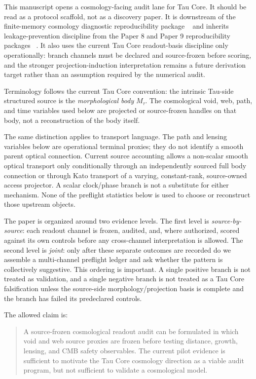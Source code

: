 \documentclass[11pt]{article}
\begin{document}
This manuscript opens a cosmology-facing audit lane for Tau Core. It should be
read as a protocol scaffold, not as a discovery paper. It is downstream of the
finite-memory cosmology diagnostic reproducibility package
~\cite{Paper5FiniteMemory} and inherits leakage-prevention discipline from the
Paper 8 and Paper 9 reproducibility packages
~\cite{Paper8ForwardReadout,Paper9ProjectionReadout}.
It also uses the current Tau Core readout-basis discipline only operationally:
branch channels must be declared and source-frozen before scoring, and the
stronger projection-induction interpretation remains a future derivation target
rather than an assumption required by the numerical audit.

Terminology follows the current Tau Core convention: the intrinsic Tau-side
structured source is the \emph{morphological body} \(M_\tau\).  The
cosmological void, web, path, and time variables used below are projected or
source-frozen handles on that body, not a reconstruction of the body itself.

The same distinction applies to transport language. The path and lensing
variables below are operational terminal proxies; they do not identify a
smooth parent optical connection. Current source accounting allows a
non-scalar smooth optical transport only conditionally through an independently
sourced full body connection or through Kato transport of a varying,
constant-rank, source-owned access projector. A scalar clock/phase branch is
not a substitute for either mechanism. None of the preflight statistics below
is used to choose or reconstruct those upstream objects.

The paper is organized around two evidence levels.  The first level is
\emph{source-by-source}: each readout channel is frozen, audited, and, where
authorized, scored against its own controls before any cross-channel
interpretation is allowed.  The second level is \emph{joint}: only after these
separate outcomes are recorded do we assemble a multi-channel preflight ledger
and ask whether the pattern is collectively suggestive.  This ordering is
important.  A single positive branch is not treated as validation, and a single
negative branch is not treated as a Tau Core falsification unless the
source-side morphology/projection basis is complete and the branch has failed
its predeclared controls.

The allowed claim is:

\begin{quote}
A source-frozen cosmological readout audit can be formulated in which void and
web source proxies are frozen before testing distance, growth, lensing, and CMB
safety observables. The current pilot evidence is sufficient to motivate the
Tau Core cosmology direction as a viable audit program, but not sufficient to
validate a cosmological model.
\end{quote}
\end{document}
